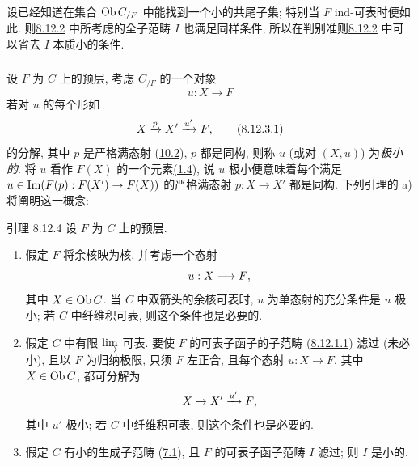 \paragraph{}
设已经知道在集合 $\operatorname{Ob} C_{/F}$ 中能找到一个小的共尾子集;
特别当 $F$ ind-可表时便如此.
则\hyperref[I.prop8.12.2]{8.12.2} 中所考虑的全子范畴 $I$ 也满足同样条件,
所以在判别准则\hyperref[I.prop8.12.2]{8.12.2} 中可以省去 $I$ 本质小的条件.




\subsubsection{}
设 $F$ 为 $C$ 上的预层, 考虑 $C_{/F}$ 的一个对象
$$
u:X\longrightarrow F
$$
若对 $u$ 的每个形如
\hypertarget{sga4.exp.I.equation.8.12.3.1}{}\begin{equation}
X\xrightarrow{p}X'\xrightarrow{u'}F{},\tag{8.12.3.1}
\end{equation}
的分解, 其中 $p$ 是严格满态射 (\hyperref[I.sec10.2]{10.2}),
$p$ 都是同构, 则称 $u$ (或对 $(X,u)$) 为\emph{极小的}.
将 $u$ 看作 $F(X)$ 的一个元素\hyperref[I.prop1.4]{(1.4)},
说 $u$ 极小便意味着\pageoriginale 每个满足
$u\in
\operatorname{Im}(F(p):F(X')\rightarrow F(X))$ 的严格满态射 $p:X\rightarrow X'$
都是同构. 下列引理的 a) 将阐明这一概念:

\begin{enonce*}{引理 8.12.4}
设 $F$ 为 $C$ 上的预层.
\begin{enumerate}
\renewcommand{\theenumi}{\alph{enumi}}
\renewcommand{\labelenumi}{\theenumi)}
\item 假定 $F$ 将余核映为核, 并考虑一个态射
$$
u:X\longrightarrow F{},
$$
其中 $X\in \operatorname{Ob} C$. 当 $C$ 中双箭头的余核可表时,
$u$ 为单态射的充分条件是 $u$ 极小;
若 $C$ 中纤维积可表, 则这个条件也是必要的.

\item 假定 $C$ 中有限 $\varinjlim$ 可表.
要使 $F$ 的可表子函子的子范畴 (\hyperref[I.8.12.1.1]{8.12.1.1})
滤过 (未必小), 且以 $F$ 为归纳极限,
只须 $F$ 左正合, 且每个态射 $u:X\rightarrow F$,
其中 $X\in \operatorname{Ob} C$, 都可分解为
$$
X\rightarrow X'\xrightarrow{u'}F{},
$$
其中 $u'$ 极小; 若 $C$ 中纤维积可表, 则这个条件也是必要的.

\item 假定 $C$ 有小的生成子范畴 (\hyperref[I.def7.1]{7.1}),
且 $F$ 的可表子函子范畴 $I$ 滤过; 则 $I$ 是小的.
\end{enumerate}
\end{enonce*}

